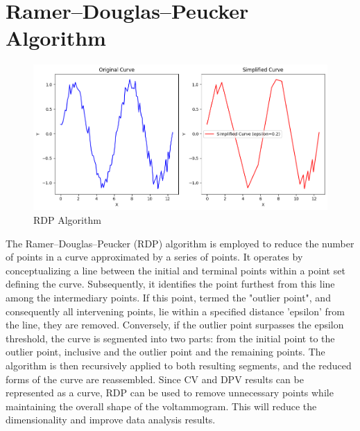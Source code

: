 \section{Ramer–Douglas–Peucker Algorithm}
\begin{figure}[h!]
  \centering
    \includegraphics[width=1.0\textwidth]{figures/rdp.png}
    \caption{RDP Algorithm}
    \label{rdp}
\end{figure}
The Ramer–Douglas–Peucker (RDP) algorithm is employed to reduce the number of points in a curve approximated by a series of points. It operates by conceptualizing a line between the initial and terminal points within a point set defining the curve. Subsequently, it identifies the point furthest from this line among the intermediary points. If this point, termed the "outlier point", and consequently all intervening points, lie within a specified distance 'epsilon' from the line, they are removed. Conversely, if the outlier point surpasses the epsilon threshold, the curve is segmented into two parts: from the initial point to the outlier point, inclusive and the outlier point and the remaining points. The algorithm is then recursively applied to both resulting segments, and the reduced forms of the curve are reassembled. Since CV and DPV results can be represented as a curve, RDP can be used to remove unnecessary points while maintaining the overall shape of the voltammogram. This will reduce the dimensionality and improve data analysis results.
